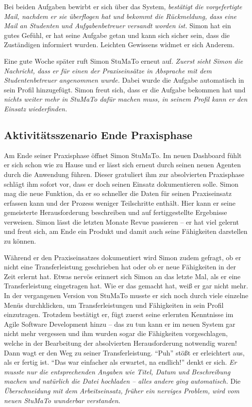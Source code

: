 \documentclass[
  12pt,
  ngerman,
  a4paper,
]{article}
\begin{document}
Bei beiden Aufgaben bewirbt er sich über das System, \emph{bestätigt die
vorgefertigte Mail, nachdem er sie überflogen hat und bekommt die
Rückmeldung, dass eine Mail an Studenten und Aufgabenbetreuer versandt
worden ist.} Simon hat ein gutes Gefühl, er hat seine Aufgabe getan und
kann sich sicher sein, dass die Zuständigen informiert wurden. Leichten
Gewissens widmet er sich Anderem.

Eine gute Woche später ruft Simon StuMaTo erneut auf. \emph{Zuerst sieht
Simon die Nachricht, dass er für einen der Praxiseinsätze in Absprache
mit dem Studentenbetreuer angenommen wurde.} Dabei wurde die Aufgabe
automatisch in sein Profil hinzugefügt. Simon freut sich, dass er die
Aufgabe bekommen hat und \emph{nichts weiter mehr in StuMaTo dafür
machen muss, in seinem Profil kann er den Einsatz wiederfinden.}

\hypertarget{aktivituxe4tsszenario-ende-praxisphase}{%
\subsection{Aktivitätsszenario Ende
Praxisphase}\label{aktivituxe4tsszenario-ende-praxisphase}}

Am Ende seiner Praxisphase öffnet Simon StuMaTo. Im neuen Dashboard
fühlt er sich schon wie zu Hause und er lässt sich erneut durch seinen
neuen Agenten durch die Anwendung führen. Dieser gratuliert ihm zur
absolvierten Praxisphase schlägt ihm sofort vor, dass er doch seinen
Einsatz dokumentieren solle. Simon mag die neue Funktion, da er so
schneller die Daten für seinen Praxiseinsatz erfassen kann und der
Prozess weniger Teilschritte enthält. Hier kann er seine gemeisterte
Herausforderung beschreiben und auf fertiggestellte Ergebnisse
verweisen. Simon lässt die letzten Monate Revue passieren -- er hat viel
gelernt und freut sich, am Ende ein Produkt und damit auch seine
Fähigkeiten darstellen zu können.

Während er den Praxiseinsatzes dokumentiert wird Simon zudem gefragt, ob
er nicht eine Transferleistung geschrieben hat oder ob er neue
Fähigkeiten in der Zeit erlernt hat. Etwas nervös erinnert sich Simon an
das letzte Mal, als er eine Transferleistung eingetragen hat. Wie er das
gemacht hat, weiß er gar nicht mehr. In der vergangenen Version von
StuMaTo musste er sich noch durch viele einzelne Menüs durchklicken, um
Transferleistungen und Fähigkeiten in sein Profil einzutragen. Trotzdem
bestätigt er, fügt zuerst seine erlernten Kenntnisse im Agile Software
Development hinzu -- das zu tun kann er im neuen System gar nicht mehr
vergessen und ihm wurden sogar die Fähigkeiten vorgeschlagen, welche in
der Bearbeitung der absolvierten Herausforderung notwendig waren! Dann
wagt er den Weg zu seiner Transferleistung. ``Puh'' stößt er erleichtert
aus, als er fertig ist. ``Das war einfacher als erwartet, na endlich!''
denkt er sich. \emph{Er musste nur die entsprechenden Angaben wie Titel,
Datum und Beschreibung machen und natürlich die Datei hochladen -- alles
andere ging automatisch.} Die \emph{Überschneidung mit dem
Arbeitseinsatz, früher ein nerviges Problem, wird vom neuen StuMaTo
wunderbar verstanden}.
\end{document}
